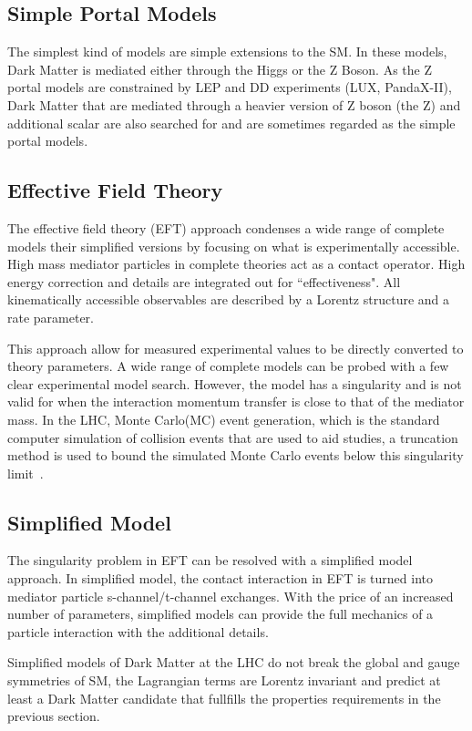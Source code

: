 \subsection{Simple Portal Models}
The simplest kind of models are simple extensions to the SM. In these models, Dark Matter is mediated either through the Higgs or the Z Boson. As the Z portal models are constrained by LEP and DD experiments (LUX, PandaX-II), Dark Matter that are mediated through a heavier version of Z boson (the Z\prime) and additional scalar are also searched for and are sometimes regarded as the simple portal models.

\subsection{Effective Field Theory}
\label{sec:EFT}
The effective field theory (EFT) approach condenses a wide range of complete models their simplified versions by focusing on what is experimentally accessible. High mass mediator particles in complete theories act as a contact operator. High energy correction and details are integrated out for ``effectiveness". All kinematically accessible observables are described by a Lorentz structure and a rate parameter. 

This approach allow for measured experimental values to be directly converted to theory parameters. A wide range of complete models can be probed with a few clear experimental model search. However, the model has a singularity and is not valid for when the interaction momentum transfer is close to that of the mediator mass. In the LHC, Monte Carlo(MC) event generation, which is the standard computer simulation of collision events that are used to aid studies, a truncation method is used to bound
the simulated Monte Carlo events below this singularity limit~\cite{Busoni_2014}.

\subsection{Simplified Model}
The singularity problem in EFT can be resolved with a simplified model approach. In simplified model, the contact interaction in EFT is turned into mediator particle s-channel/t-channel exchanges. With the price of an increased number of parameters, simplified models can provide the full mechanics of a particle interaction with the additional details. 

Simplified models of Dark Matter at the LHC do not break the global and gauge symmetries of SM, the Lagrangian terms are Lorentz invariant and predict at least a Dark Matter candidate that fullfills the properties requirements in the previous section. 

